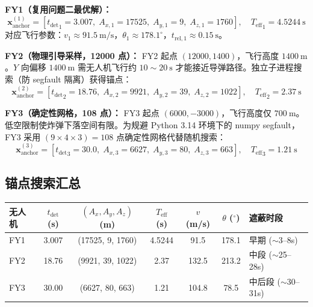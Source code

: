 \documentclass[12pt,a4paper]{ctexart}
\newcommand{\tdet}{t_{\text{det}}}
\newcommand{\Teff}{T_{\text{eff}}}
\begin{document}
\textbf{FY1（复用问题二最优解）：}
\begin{equation}
\boxed{\mathbf{x}^{(1)}_{\text{anchor}} = [{\tdet}_1 = 3.007,\; A_{x,1} = 17525,\; A_{y,1} = 9,\; A_{z,1} = 1760], \quad {\Teff}_1 = 4.5244\ \mathrm{s}}
\end{equation}
对应飞行参数：$v_1 \approx 91.5\ \mathrm{m/s}$，$\theta_1 \approx 178.1^\circ$，$t_{\text{rel},1} \approx 0.15\ \mathrm{s}$。

\textbf{FY2（物理引导采样，12000 点）：}
FY2 起点 $(12000, 1400)$，飞行高度 $1400\ \mathrm{m}$。$Y$ 向偏移 $1400\ \mathrm{m}$ 需无人机飞行约 $10 \sim 20\ \mathrm{s}$ 才能接近导弹路径。独立子进程搜索（防 segfault 隔离）获得锚点：
\begin{equation}
\boxed{\mathbf{x}^{(2)}_{\text{anchor}} = [{\tdet}_2 = 18.76,\; A_{x,2} = 9921,\; A_{y,2} = 39,\; A_{z,2} = 1022], \quad {\Teff}_2 = 2.37\ \mathrm{s}}
\label{eq:fy2-anchor}
\end{equation}

\textbf{FY3（确定性网格，108 点）：}
FY3 起点 $(6000, -3000)$，飞行高度仅 $700\ \mathrm{m}$。低空限制使炸弹下落空间有限。为规避 Python 3.14 环境下的 numpy segfault，FY3 采用 $(9 \times 4 \times 3) = 108$ 点确定性网格代替随机搜索：
\begin{equation}
\boxed{\mathbf{x}^{(3)}_{\text{anchor}} = [{\tdet}_3 = 30.0,\; A_{x,3} = 6627,\; A_{y,3} = 80,\; A_{z,3} = 663], \quad {\Teff}_3 = 1.21\ \mathrm{s}}
\label{eq:fy3-anchor}
\end{equation}

\subsection{锚点搜索汇总}

\begin{center}
\begin{tabular}{lcccccl}
\toprule
\textbf{无人机} & $\tdet$ (s) & $(A_x, A_y, A_z)$ (m) & ${\Teff}$ (s) & $v$ (m/s) & $\theta$ ($^\circ$) & \textbf{遮蔽时段} \\
\midrule
FY1 & 3.007 & (17525, 9, 1760) & 4.5244 & 91.5 & 178.1 & 早期 ($\sim$3--8s) \\
FY2 & 18.76 & (9921, 39, 1022) & 2.37 & 132.5 & 213.2 & 中段 ($\sim$25--28s) \\
FY3 & 30.00 & (6627, 80, 663)  & 1.21 & 104.8 & 78.5  & 中后段 ($\sim$30--31s) \\
\bottomrule
\end{tabular}
\end{center}
\end{document}
